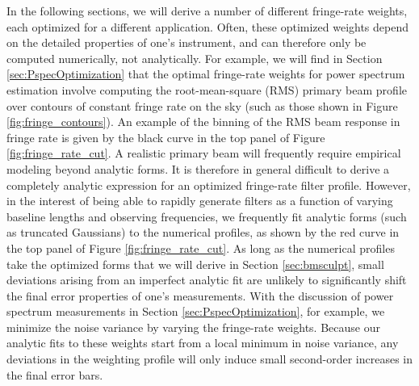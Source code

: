 \documentclass[twocolumn,apj,numberedappendix]{emulateapj}
\begin{document}
In the following sections, we will derive a number of different fringe-rate
weights, each optimized for a different application. Often, these optimized
weights depend on the detailed properties of one's instrument, and can
therefore only be computed numerically, not analytically. For example, we will
find in Section \ref{sec:PspecOptimization} that the optimal fringe-rate
weights for power spectrum estimation involve computing the root-mean-square
(RMS) primary beam profile over contours of constant fringe rate on the sky
(such as those shown in Figure \ref{fig:fringe_contours}).  An example of the
binning of the RMS beam response in fringe rate is given by the black curve in
the top panel of Figure \ref{fig:fringe_rate_cut}.  A realistic primary beam will
frequently require empirical modeling beyond analytic forms. It is therefore in
general difficult to derive a completely analytic expression for an optimized
fringe-rate filter profile. However, in the interest of being able to rapidly
generate filters as a function of varying baseline lengths and observing
frequencies, we frequently fit analytic forms (such as truncated Gaussians) to
the numerical profiles, as shown by the red curve in the top panel of Figure
\ref{fig:fringe_rate_cut}.  As long as the numerical profiles take the
optimized forms that we will derive in Section \ref{sec:bmsculpt}, small
deviations arising from an imperfect analytic fit are unlikely to significantly
shift the final error properties of one's measurements. With the discussion of
power spectrum measurements in Section \ref{sec:PspecOptimization}, for
example, we minimize the noise variance by varying the fringe-rate weights.
Because our analytic fits to these weights start from a local minimum in noise
variance, any deviations in the weighting profile will only induce small
second-order increases in the final error bars.


%
%
\end{document}
